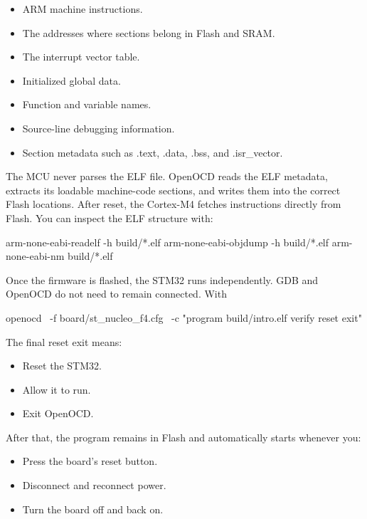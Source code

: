 \documentclass{report}
\begin{document}
    \begin{itemize}
        \item ARM machine instructions.
        \item The addresses where sections belong in Flash and SRAM.
        \item The interrupt vector table.
        \item Initialized global data.
        \item Function and variable names.
        \item Source-line debugging information.
        \item Section metadata such as .text, .data, .bss, and .isr_vector.
    \end{itemize}
    The MCU never parses the ELF file. OpenOCD reads the ELF metadata, extracts its loadable machine-code sections, and writes them into the correct Flash locations. After reset, the Cortex-M4 fetches instructions directly from Flash.
    \bigbreak \noindent 
    You can inspect the ELF structure with:
    \bigbreak \noindent 
    \begin{bashcode}
        arm-none-eabi-readelf -h build/*.elf
        arm-none-eabi-objdump -h build/*.elf
        arm-none-eabi-nm build/*.elf
    \end{bashcode}
    \bigbreak \noindent 
    Once the firmware is flashed, the STM32 runs independently. GDB and OpenOCD do not need to remain connected. With
    \bigbreak \noindent 
    \begin{bashcode}
        openocd \
            -f board/st_nucleo_f4.cfg \
            -c "program build/intro.elf verify reset exit"
    \end{bashcode}
    \bigbreak \noindent 
    The final reset exit means:
    \begin{itemize}
        \item Reset the STM32.
        \item Allow it to run.
        \item Exit OpenOCD.
    \end{itemize}
    After that, the program remains in Flash and automatically starts whenever you:
    \begin{itemize}
        \item Press the board’s reset button.
        \item Disconnect and reconnect power.
        \item Turn the board off and back on.
    \end{itemize}
\end{document}
